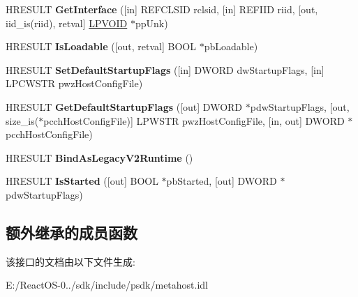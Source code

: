 \begin{DoxyCompactItemize}
\item 
\mbox{\label{interface_i_c_l_r_runtime_info_acacbf1e505341f97ac4b82ff0a2641d2}} 
H\+R\+E\+S\+U\+LT {\bfseries Get\+Interface} (\mbox{[}in\mbox{]} R\+E\+F\+C\+L\+S\+ID rclsid, \mbox{[}in\mbox{]} R\+E\+F\+I\+ID riid, \mbox{[}out, iid\+\_\+is(riid), retval\mbox{]} \hyperlink{interfacevoid}{L\+P\+V\+O\+ID} $\ast$pp\+Unk)
\item 
\mbox{\label{interface_i_c_l_r_runtime_info_a20010106b21d2f069d38a72dbf36e0ff}} 
H\+R\+E\+S\+U\+LT {\bfseries Is\+Loadable} (\mbox{[}out, retval\mbox{]} B\+O\+OL $\ast$pb\+Loadable)
\item 
\mbox{\label{interface_i_c_l_r_runtime_info_a6b7e7fc1fc36ef26d48ef0a10a3eb785}} 
H\+R\+E\+S\+U\+LT {\bfseries Set\+Default\+Startup\+Flags} (\mbox{[}in\mbox{]} D\+W\+O\+RD dw\+Startup\+Flags, \mbox{[}in\mbox{]} L\+P\+C\+W\+S\+TR pwz\+Host\+Config\+File)
\item 
\mbox{\label{interface_i_c_l_r_runtime_info_a2c432c944d02ea4912034565fc1ea726}} 
H\+R\+E\+S\+U\+LT {\bfseries Get\+Default\+Startup\+Flags} (\mbox{[}out\mbox{]} D\+W\+O\+RD $\ast$pdw\+Startup\+Flags, \mbox{[}out, size\+\_\+is($\ast$pcch\+Host\+Config\+File)\mbox{]} L\+P\+W\+S\+TR pwz\+Host\+Config\+File, \mbox{[}in, out\mbox{]} D\+W\+O\+RD $\ast$pcch\+Host\+Config\+File)
\item 
\mbox{\label{interface_i_c_l_r_runtime_info_abac41fa4058bd607a0e302d297f61db4}} 
H\+R\+E\+S\+U\+LT {\bfseries Bind\+As\+Legacy\+V2\+Runtime} ()
\item 
\mbox{\label{interface_i_c_l_r_runtime_info_ae07db2687b4ace7dde139940515827b6}} 
H\+R\+E\+S\+U\+LT {\bfseries Is\+Started} (\mbox{[}out\mbox{]} B\+O\+OL $\ast$pb\+Started, \mbox{[}out\mbox{]} D\+W\+O\+RD $\ast$pdw\+Startup\+Flags)
\end{DoxyCompactItemize}
\subsection*{额外继承的成员函数}


该接口的文档由以下文件生成\+:\begin{DoxyCompactItemize}
\item 
E\+:/\+React\+O\+S-\/0../sdk/include/psdk/metahost.\+idl\end{DoxyCompactItemize}
